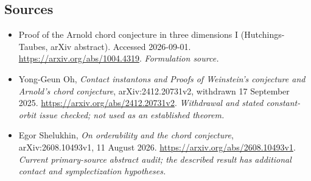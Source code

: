 \documentclass[11pt]{article}
\begin{document}
\subsection{Sources}
\begin{itemize}
\item[S1]Proof of the Arnold chord conjecture in three dimensions I (Hutchings-Taubes, arXiv abstract). Accessed 2026-09-01.
\url{https://arxiv.org/abs/1004.4319}.
\textit{Formulation source.}
\item[E1]Yong-Geun Oh, \emph{Contact instantons and Proofs of Weinstein's conjecture and Arnold's chord conjecture}, arXiv:2412.20731v2, withdrawn 17 September 2025.
\url{https://arxiv.org/abs/2412.20731v2}.
\textit{Withdrawal and stated constant-orbit issue checked; not used as an established theorem.}
\item[E2]Egor Shelukhin, \emph{On orderability and the chord conjecture}, arXiv:2608.10493v1, 11 August 2026.
\url{https://arxiv.org/abs/2608.10493v1}.
\textit{Current primary-source abstract audit; the described result has additional contact and symplectization hypotheses.}
\end{itemize}
\end{document}
